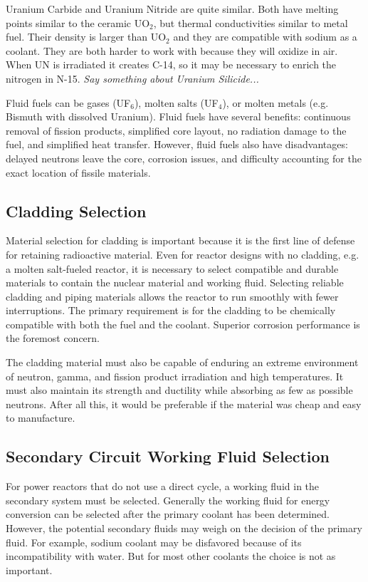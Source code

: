 Uranium Carbide and Uranium Nitride are quite similar. Both have melting points similar to the ceramic UO$_2$, but thermal conductivities similar to metal fuel. 
Their density is larger than UO$_2$ and they are compatible with sodium as a coolant.
They are both harder to work with because they will oxidize in air. 
When UN is irradiated it creates C-14, so it may be necessary to enrich the nitrogen in N-15.
\textit{Say something about Uranium Silicide...}

Fluid fuels can be gases (UF$_6$), molten salts (UF$_4$), or molten metals (e.g. Bismuth with dissolved Uranium). Fluid fuels have several benefits\cite{handbook}: continuous removal of fission products, simplified core layout, no radiation damage to the fuel, and simplified heat transfer.
However, fluid fuels also have disadvantages: delayed neutrons leave the core, corrosion issues, and difficulty accounting for the exact location of fissile materials.


\subsection{Cladding Selection}
Material selection for cladding is important because it is the first line of defense for retaining radioactive material.
Even for reactor designs with no cladding, e.g. a molten salt-fueled reactor, it is necessary to select compatible and durable materials to contain the nuclear material and working fluid.
Selecting reliable cladding and piping materials allows the reactor to run smoothly with fewer interruptions. The primary requirement is for the cladding to be chemically compatible with both the fuel and the coolant. Superior corrosion performance is the foremost concern.

The cladding material must also be capable of enduring an extreme environment of neutron, gamma, and fission product irradiation and high temperatures. It must also maintain its strength and ductility while absorbing as few as possible neutrons. 
After all this, it would be preferable if the material was cheap and easy to manufacture.

\subsection{Secondary Circuit Working Fluid Selection}
For power reactors that do not use a direct cycle, a working fluid in the secondary system must be selected. Generally the working fluid for energy conversion can be selected after the primary coolant has been determined. 
However, the potential secondary fluids may weigh on the decision of the primary fluid.
For example, sodium coolant may be disfavored because of its incompatibility with water. 
But for most other coolants the choice is not as important. 


